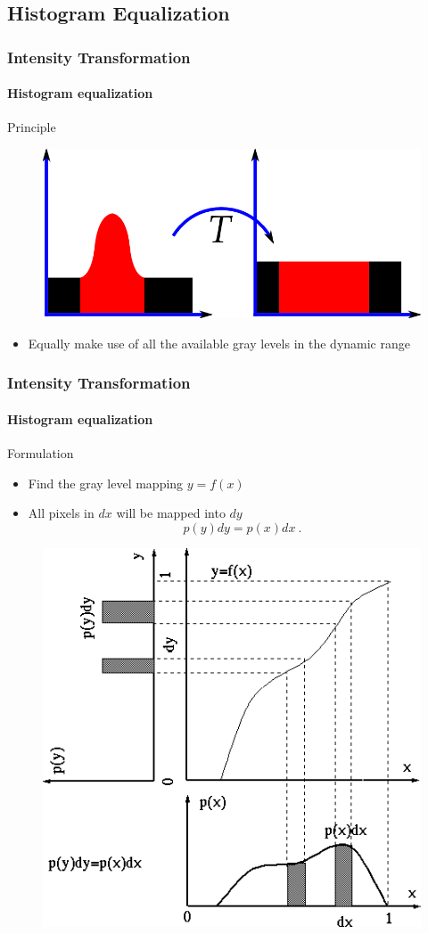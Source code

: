 \documentclass[table]{beamer}
\begin{document}
\subsection{Histogram Equalization}

\begin{frame}
  \frametitle{Intensity Transformation}
  \framesubtitle{Histogram equalization}
  \begin{block}{Principle}\footnotesize
    \begin{figure}
      \centering
      \includegraphics[width=.7\textwidth]{./images/histogram-equalization.png}
    \end{figure}
    \begin{itemize}
      \item Equally make use of all the available gray levels in the dynamic range
    \end{itemize}
  \end{block}
\end{frame}

\begin{frame}
  \frametitle{Intensity Transformation}
  \framesubtitle{Histogram equalization}
  \begin{block}{Formulation}\footnotesize
    \begin{itemize}
      \item Find the gray level mapping $y = f(x)$
      \item All pixels in $dx$ will be mapped into $dy$ 
        \begin{equation}\label{eq:eq1}
          p(y)dy=p(x)dx \ .
        \end{equation}
    \end{itemize}
    \begin{figure}
      \centering
      \includegraphics[width=.3\textwidth]{./images/histogram-equalization2.png}
    \end{figure}
  \end{block}
\end{frame}
\end{document}
